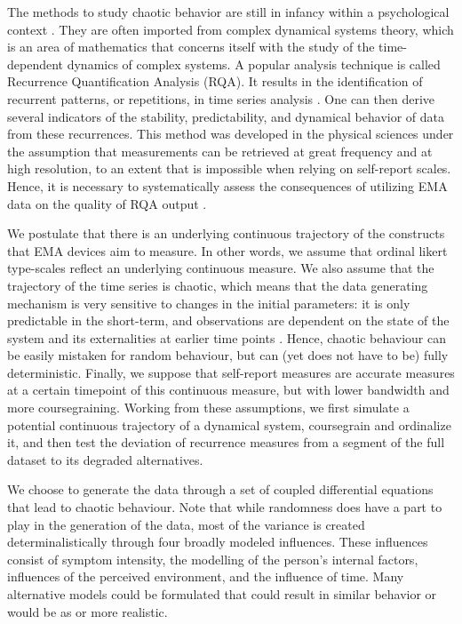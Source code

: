 \documentclass[utf8]{FrontiersinVancouver}
\begin{document}
The methods to study chaotic behavior are still in infancy within a psychological context \citep{molenaarManifestoPsychologyIdiographic2004}. They are often imported from complex dynamical systems theory, which is an area of mathematics that concerns itself with the study of the time-dependent dynamics of complex systems. A popular analysis technique is called Recurrence Quantification Analysis (RQA). It results in the identification of recurrent patterns, or repetitions, in time series analysis \citep{webber2005recurrence}. One can then derive several indicators of the stability, predictability, and dynamical behavior of data from these recurrences. This method was developed in the physical sciences under the assumption that measurements can be retrieved at great frequency and at high resolution, to an extent that is impossible when relying on self-report scales. Hence, it is necessary to systematically assess the consequences of utilizing EMA data on the quality of RQA output \citep{haslbeckRecoveringWithinpersonDynamics2022}. 

We postulate that there is an underlying continuous trajectory of the constructs that EMA devices aim to measure. In other words, we assume that ordinal likert type-scales reflect an underlying continuous measure. We also assume that the trajectory of the time series is chaotic, which means that the data generating mechanism is very sensitive to changes in the initial parameters: it is only predictable in the short-term, and observations are dependent on the state of the system and its externalities at earlier time points \citep{olthofComplexityPsychologicalSelfratings2020b}. Hence, chaotic behaviour can be easily mistaken for random behaviour, but can (yet does not have to be) fully deterministic. Finally, we suppose that self-report measures are accurate measures at a certain timepoint of this continuous measure, but with lower bandwidth and more coursegraining. Working from these assumptions, we first simulate a potential continuous trajectory of a dynamical system, coursegrain and ordinalize it, and then test the deviation of recurrence measures from a segment of the full dataset to its degraded alternatives.

We choose to generate the data through a set of coupled differential equations that lead to chaotic behaviour. Note that while randomness does have a part to play in the generation of the data, most of the variance is created determinalistically through four broadly modeled influences. These influences consist of symptom intensity, the modelling of the person's internal factors, influences of the perceived environment, and the influence of time. Many alternative models could be formulated that could result in similar behavior or would be as or more realistic.  
\end{document}
